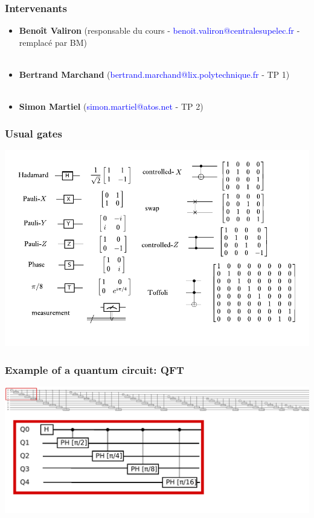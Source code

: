 \documentclass{beamer}
\begin{document}
\begin{frame}
\frametitle{Intervenants}
\begin{itemize}
\item \textbf{Beno\^{i}t Valiron} (responsable du cours - \textcolor{blue}{ benoit.valiron@centralesupelec.fr} - remplac\'{e} par BM)\\~\\
\item \textbf{Bertrand Marchand} (\textcolor{blue}{bertrand.marchand@lix.polytechnique.fr} - TP 1)\\~\\
\item \textbf{Simon Martiel} (\textcolor{blue}{simon.martiel@atos.net} - TP 2)
\end{itemize}
\end{frame}

\begin{frame}
\frametitle{Usual gates}
\includegraphics[width=\textwidth]{quantum_gates.pdf}
\end{frame}

\begin{frame}
\frametitle{Example of a quantum circuit: QFT}

\begin{center}
\includegraphics[width=\textwidth]{qft.pdf}
\end{center}

\end{frame}
\end{document}
